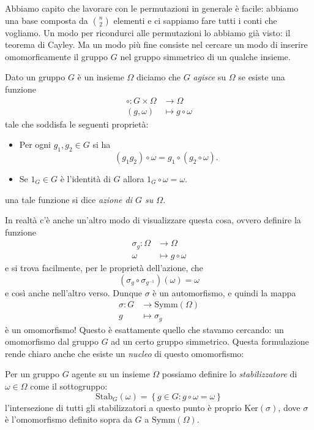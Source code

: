 \documentclass[11pt]{scrartcl}
\renewcommand{\ker}[1]{\text{Ker}\left(#1\right)}
\begin{document}
	Abbiamo capito che lavorare con le permutazioni in generale è facile: abbiamo una base composta da $\binom{n}{2}$ elementi e ci sappiamo fare tutti i conti che vogliamo. Un modo per ricondurci alle permutazioni lo abbiamo già visto: il teorema di Cayley. Ma un modo più fine consiste nel cercare un modo di inserire omomorficamente il gruppo $G$ nel gruppo simmetrico di un qualche insieme.
	\begin{definition}
		Dato un gruppo $G$ è un insieme $\Omega$ diciamo che $G$ \textit{agisce} su $\Omega$ se esiste una funzione
		\begin{align*}
			\circ:G\times \Omega  &\to \Omega \\
			\left(g,\omega\right) &\mapsto g\circ \omega
		\end{align*}
		tale che soddisfa le seguenti proprietà:
		\begin{itemize}
			\item Per ogni $g_1,g_2\in G$ si ha 
			$$\left(g_1g_2\right)\circ \omega=g_1\circ \left(g_2\circ \omega\right).$$
			\item Se $1_G\in G$ è l'identità di $G$ allora $1_G\circ \omega=\omega$.
		\end{itemize}
		una tale funzione si dice \textit{azione di $G$ su $\Omega$}.
	\end{definition}
	In realtà c'è anche un'altro modo di visualizzare questa cosa, ovvero definire la funzione
	\begin{align*}
		\sigma_g:\Omega & \to \Omega \\
		\omega & \mapsto g\circ \omega
	\end{align*}
	e si trova facilmente, per le proprietà dell'azione, che 
	$$\left(\sigma_g\circ \sigma_{g^{-1}}\right)(\omega)=\omega$$
	e così anche nell'altro verso. Dunque $\sigma$ è un automorfismo, e quindi la mappa
	\begin{align*}
		\sigma:G & \to \text{Symm}(\Omega) \\
		g & \mapsto \sigma_g
	\end{align*}
	è un omomorfismo! Questo è esattamente quello che stavamo cercando: un omomorfismo dal gruppo $G$ ad un certo gruppo simmetrico. Questa formulazione rende chiaro anche che esiste un \textit{nucleo} di questo omomorfismo:
	\begin{definition}[Stabilizzatore]
		Per un gruppo $G$ agente su un insieme $\Omega$ possiamo definire lo \textit{stabilizzatore} di $\omega\in \Omega$ come il sottogruppo:
		$$\text{Stab}_G(\omega)=\left\{g\in G:g\circ \omega=\omega\right\}$$
		l'intersezione di tutti gli stabilizzatori a questo punto è proprio $\ker{\sigma}$, dove $\sigma$ è l'omomorfismo definito sopra da $G$ a $\text{Symm}(\Omega)$. 
	\end{definition}
\end{document}

